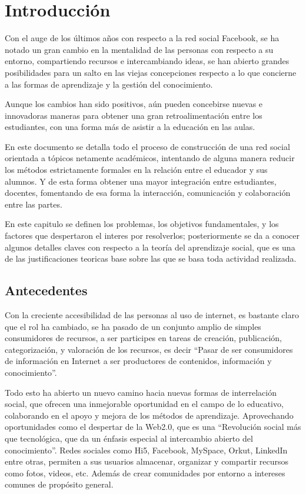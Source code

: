 \chapter{Introducción}

Con el auge de los últimos años con respecto a la red social Facebook\cite{Jeria}, se ha notado un gran cambio en la
mentalidad de las personas con respecto a su entorno, compartiendo recursos e intercambiando ideas, se han abierto 
grandes posibilidades para un salto en las viejas concepciones respecto a lo que concierne a las formas de aprendizaje y
la gestión del conocimiento.

Aunque los cambios han sido positivos, aún pueden concebirse nuevas e innovadoras maneras para obtener una gran 
retroalimentación entre los estudiantes, con una forma más de asistir a la educación en las aulas.

En este documento se detalla todo el proceso de construcción de una red social orientada a tópicos netamente académicos,
intentando de alguna manera reducir los métodos estrictamente formales en la relación entre el educador y sus alumnos. Y
de esta forma obtener una mayor integración entre estudiantes, docentes, fomentando de esa forma la interacción,
comunicación y colaboración entre las partes.

En este capitulo se definen los problemas, los objetivos fundamentales, y los factores que despertaron el interes por resolverlos; posteriormente se da a conocer algunos detalles claves con respecto a la teoría del aprendizaje social,
que es una de las justificaciones teoricas base sobre las que se basa toda actividad realizada.

\section{Antecedentes}
Con la creciente accesibilidad de las personas al uso de internet, es bastante claro que el rol ha cambiado, se ha
pasado de un conjunto amplio de simples consumidores de recursos, a ser participes en tareas de creación, publicación,
categorización, y valoración de los recursos, es decir “Pasar de ser consumidores de información en Internet a ser
productores de contenidos, información y conocimiento”\cite{Rodriguez}.

Todo esto ha abierto un nuevo camino hacia nuevas formas de interrelación social, que ofrecen una inmejorable oportunidad
en el campo de lo educativo, colaborando en el apoyo y mejora de los métodos de aprendizaje. Aprovechando oportunidades
como el despertar de la Web2.0, que es una “Revolución social más que tecnológica, que da un énfasis especial al
intercambio abierto del conocimiento”\cite{Rodriguez}. Redes sociales como Hi5, Facebook, MySpace, Orkut, LinkedIn entre
otras, permiten a sus usuarios almacenar, organizar y compartir recursos como fotos, videos, etc. Además de crear
comunidades por entorno a intereses comunes de propósito general.

